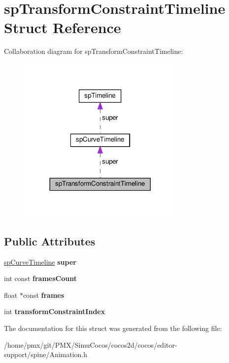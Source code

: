 \hypertarget{structspTransformConstraintTimeline}{}\section{sp\+Transform\+Constraint\+Timeline Struct Reference}
\label{structspTransformConstraintTimeline}


Collaboration diagram for sp\+Transform\+Constraint\+Timeline\+:
\nopagebreak
\begin{figure}[H]
\begin{center}
\leavevmode
\includegraphics[width=233pt]{structspTransformConstraintTimeline__coll__graph}
\end{center}
\end{figure}
\subsection*{Public Attributes}
\begin{DoxyCompactItemize}
\item 
\mbox{\label{structspTransformConstraintTimeline_ab7765730d1b43edd082a4b6d4221cab6}} 
\hyperlink{structspCurveTimeline}{sp\+Curve\+Timeline} {\bfseries super}
\item 
\mbox{\label{structspTransformConstraintTimeline_a0b535a4066e5143d085572adb9006f6d}} 
int const {\bfseries frames\+Count}
\item 
\mbox{\label{structspTransformConstraintTimeline_a394436b0fd8f0a39b2d2b8ce81c049a4}} 
float $\ast$const {\bfseries frames}
\item 
\mbox{\label{structspTransformConstraintTimeline_adba2a0ba81ffe7d0a302bf0c099d07cc}} 
int {\bfseries transform\+Constraint\+Index}
\end{DoxyCompactItemize}


The documentation for this struct was generated from the following file\+:\begin{DoxyCompactItemize}
\item 
/home/pmx/git/\+P\+M\+X/\+Simu\+Cocos/cocos2d/cocos/editor-\/support/spine/Animation.\+h\end{DoxyCompactItemize}
